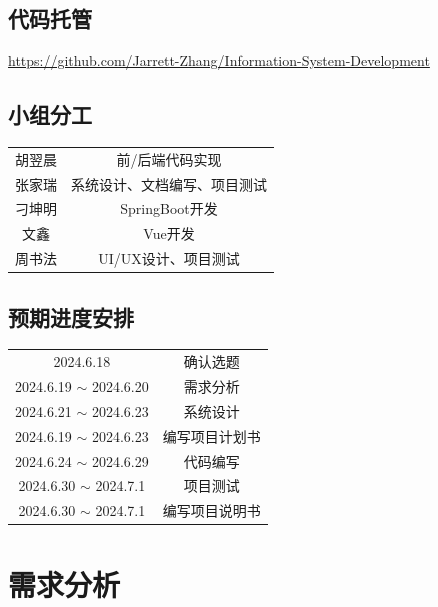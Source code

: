 \documentclass{article}
\begin{document}
\subsection{代码托管}
\href{https://github.com/Jarrett-Zhang/Information-System-Development}{https://github.com/Jarrett-Zhang/Information-System-Development}

\subsection{小组分工}
\begin{center}
\begin{tabular}{c|c}
胡翌晨 & 前/后端代码实现\\
张家瑞 & 系统设计、文档编写、项目测试\\
刁坤明 & SpringBoot开发\\
文鑫 & Vue开发\\
周书法 & UI/UX设计、项目测试\\
\end{tabular}
\end{center}

\subsection{预期进度安排}
\begin{center}
\begin{tabular}{c|c}
2024.6.18 & 确认选题\\
2024.6.19 $\sim$ 2024.6.20 & 需求分析\\
2024.6.21 $\sim$ 2024.6.23 & 系统设计\\
2024.6.19 $\sim$ 2024.6.23 & 编写项目计划书\\
2024.6.24 $\sim$ 2024.6.29 & 代码编写\\
2024.6.30 $\sim$ 2024.7.1 & 项目测试\\
2024.6.30 $\sim$ 2024.7.1 & 编写项目说明书
\end{tabular}
\end{center}


\section{需求分析}
\end{document}
